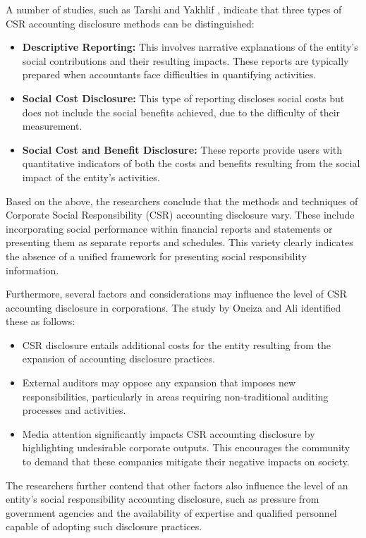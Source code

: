 \documentclass{NSP1}
\begin{document}
A number of studies, such as Tarshi and Yakhlif \cite{ref4}, indicate that three types of CSR accounting disclosure methods can be distinguished:
\begin{itemize}
\item \textbf{Descriptive Reporting:} This involves narrative explanations of the entity's social contributions and their resulting impacts. These reports are typically prepared when accountants face difficulties in quantifying activities.
\item \textbf{Social Cost Disclosure:} This type of reporting discloses social costs but does not include the social benefits achieved, due to the difficulty of their measurement.
\item \textbf{Social Cost and Benefit Disclosure:} These reports provide users with quantitative indicators of both the costs and benefits resulting from the social impact of the entity's activities.
\end{itemize}

Based on the above, the researchers conclude that the methods and techniques of Corporate Social Responsibility (CSR) accounting disclosure vary. These include incorporating social performance within financial reports and statements or presenting them as separate reports and schedules. This variety clearly indicates the absence of a unified framework for presenting social responsibility information.

Furthermore, several factors and considerations may influence the level of CSR accounting disclosure in corporations. The study by Oneiza and Ali \cite{ref26} identified these as follows:
\begin{itemize}
\item CSR disclosure entails additional costs for the entity resulting from the expansion of accounting disclosure practices.
\item External auditors may oppose any expansion that imposes new responsibilities, particularly in areas requiring non-traditional auditing processes and activities.
\item Media attention significantly impacts CSR accounting disclosure by highlighting undesirable corporate outputs. This encourages the community to demand that these companies mitigate their negative impacts on society.
\end{itemize}

The researchers further contend that other factors also influence the level of an entity's social responsibility accounting disclosure, such as pressure from government agencies and the availability of expertise and qualified personnel capable of adopting such disclosure practices.
\end{document}
